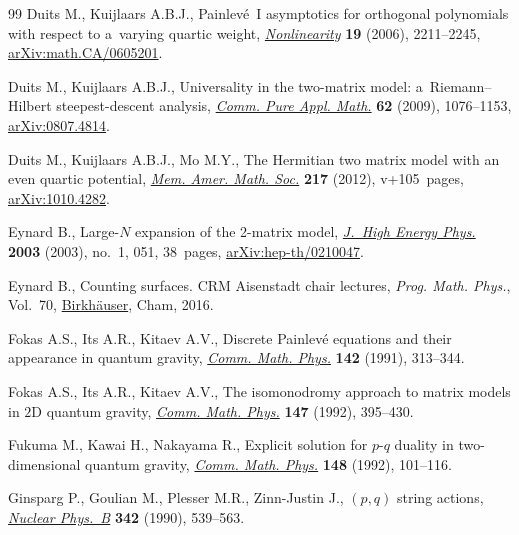\documentclass[pdftex]{sigma}
\numberwithin{equation}{section}
\begin{document}
\begin{thebibliography}{99}
Duits M., Kuijlaars A.B.J., Painlev\'e~{I} asymptotics for orthogonal
 polynomials with respect to a~varying quartic weight,
 \href{https://doi.org/10.1088/0951-7715/19/10/001}{\textit{Nonlinearity}}
 \textbf{19} (2006), 2211--2245,
 \href{http://arxiv.org/abs/math.CA/0605201}{arXiv:math.CA/0605201}.

Duits M., Kuijlaars A.B.J., Universality in the two-matrix model:
 a~{R}iemann--{H}ilbert steepest-descent analysis,
 \href{https://doi.org/10.1002/cpa.20269}{\textit{Comm. Pure Appl. Math.}}
 \textbf{62} (2009), 1076--1153,
 \href{http://arxiv.org/abs/0807.4814}{arXiv:0807.4814}.

Duits M., Kuijlaars A.B.J., Mo M.Y., The {H}ermitian two matrix model with an
 even quartic potential,
 \href{https://doi.org/10.1090/S0065-9266-2011-00639-8}{\textit{Mem. Amer.
 Math. Soc.}} \textbf{217} (2012), v+105~pages,
 \href{http://arxiv.org/abs/1010.4282}{arXiv:1010.4282}.

Eynard B., Large-{$N$} expansion of the 2-matrix model,
 \href{https://doi.org/10.1088/1126-6708/2003/01/051}{\textit{J.~High Energy
 Phys.}} \textbf{2003} (2003), no.~1, 051, 38~pages,
 \href{http://arxiv.org/abs/hep-th/0210047}{arXiv:hep-th/0210047}.

Eynard B., Counting surfaces. CRM Aisenstadt chair lectures, \textit{Prog.
 Math. Phys.}, Vol.~70,
 \href{https://doi.org/10.1007/978-3-7643-8797-6}{Birkh\"auser}, Cham, 2016.

Fokas A.S., Its A.R., Kitaev A.V., Discrete {P}ainlev\'e equations and their
 appearance in quantum gravity,
 \href{https://doi.org/10.1007/BF02102066}{\textit{Comm. Math. Phys.}}
 \textbf{142} (1991), 313--344.

Fokas A.S., Its A.R., Kitaev A.V., The isomonodromy approach to matrix models
 in {$2$}{D} quantum gravity,
 \href{https://doi.org/10.1007/BF02096594}{\textit{Comm. Math. Phys.}}
 \textbf{147} (1992), 395--430.

Fukuma M., Kawai H., Nakayama R., Explicit solution for {$p$}-{$q$} duality in
 two-dimensional quantum gravity,
 \href{https://doi.org/10.1007/BF02102366}{\textit{Comm. Math. Phys.}}
 \textbf{148} (1992), 101--116.

Ginsparg P., Goulian M., Plesser M.R., Zinn-Justin J., {$(p,q)$} string
 actions, \href{https://doi.org/10.1016/0550-3213(90)90326-9}{\textit{Nuclear
 Phys.~B}} \textbf{342} (1990), 539--563.


\end{thebibliography}
\end{document}
